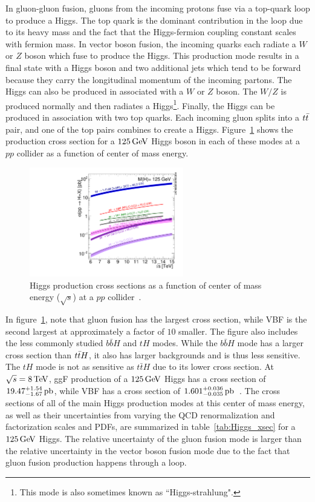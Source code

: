 In gluon-gluon fusion, gluons from the incoming protons fuse via a top-quark loop to produce a Higgs. The top quark is the dominant contribution in the loop due to its heavy mass and the fact that the Higgs-fermion coupling constant scales with fermion mass. In vector boson fusion, the incoming quarks each radiate a $W$ or $Z$ boson which fuse to produce the Higgs. This production mode results in a final state with a Higgs boson and two additional jets which tend to be forward because they carry the longitudinal momentum of the incoming partons. The Higgs can also be produced in associated with a $W$ or $Z$ boson. The $W/Z$ is produced normally and then radiates a Higgs\footnote{This mode is also sometimes known as ``Higgs-strahlung".}. Finally, the Higgs can be produced in association with two top quarks. Each incoming gluon splits into a $t\bar{t}$ pair, and one of the top pairs combines to create a Higgs. Figure~\ref{fig:Higgs_xsec} shows the production cross section for a $125 \GeV$ Higgs boson in each of these modes at a $pp$ collider as a function of center of mass energy. 
%
\begin{figure}[h!]
  \centering
  \captionsetup{justification=centering}

  \includegraphics[width=0.6\textwidth,angle=270]{figures/h125_xsec}
  \caption{Higgs production cross sections as a function of center of mass energy ($\sqrt{s}$) at a $pp$ collider~\cite{LHCXSWG}.}
  \label{fig:Higgs_xsec}
\end{figure}
%
In figure~\ref{fig:Higgs_xsec}, note that gluon fusion has the largest cross section, while VBF is the second largest at approximately a factor of $10$ smaller. The figure also includes the less commonly studied $b\bar{b}H$ and $tH$ modes. While the $b\bar{b}H$ mode has a larger cross section than $t\bar{t} H$, it also has larger backgrounds and is thus less sensitive. The $tH$ mode is not as sensitive as $t\bar{t}H$ due to its lower cross section. At $\sqrt{s} = 8 \TeV$, ggF production of a $125 \GeV$ Higgs has a cross section of $19.47^{+1.54}_{-1.67}\mbox{\,pb}$, while VBF has a cross section of $1.601^{+0.036}_{-0.035} \mbox{\,pb}$~\cite{LHCXSWG}. The cross sections of all of the main Higgs production modes at this center of mass energy, as well as their uncertainties from varying the QCD renormalization and factorization scales and PDFs, are summarized in table~\ref{tab:Higgs_xsec} for a $125 \GeV$ Higgs. The relative uncertainty of the gluon fusion mode is larger than the relative uncertainty in the vector boson fusion mode due to the fact that gluon fusion production happens through a loop. 

